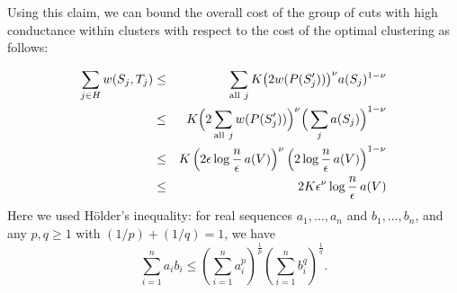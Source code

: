 \documentclass{book}
\numberwithin{exercise}{chapter}
\begin{document}
Using this claim, we can bound the overall cost of the group of cuts with
high conductance within clusters with respect to the cost of the optimal
clustering as follows:


\begin{eqnarray}
\sum_{j\in H} w(S_j,T_j)
&\leq & \sum_{\mathrm{all}\ j} K\big(2w(P(S_j'))\big)^\nu a(S_j)^{1-\nu}\nonumber\\
&\leq & K\Big( 2\sum_{\mathrm{all}\ j}w(P(S_j'))\Big)^\nu
\Big( \sum_{j} a(S_j)\Big)^{1-\nu}\nonumber\\
&\leq & K\left(2 \epsilon \log\frac{n}{\epsilon}\,a(V)\right)^{\nu}\left(2 \log
\frac{n}{\epsilon}\, a(V)\right)^{1-\nu}\nonumber\\
&\leq & 2K\epsilon^\nu \log\frac{n}{\epsilon}\,a(V)\label{2goodj}
\end{eqnarray}
Here we used H\"{o}lder's inequality: for real sequences $a_1, \ldots, a_n$ and $b_1,\ldots, b_n$,
and any $p,q \ge 1$ with $(1/p)+(1/q)=1$, we have
\[
\sum_{i=1}^n a_i b_i \le \left(\sum_{i=1}^n a_i^p\right)^{\frac{1}{p}}\left(\sum_{i=1}^n b_i^q\right)^{\frac{1}{q}}.
\]
\end{document}
